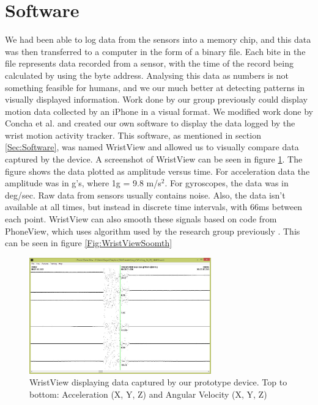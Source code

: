 \section{Software}
\label{Sec:ResultsSoftware}
We had been able to log data from the sensors into a memory chip,
and this data was then transferred to a computer in the form of a binary file.
Each bite in the file represents data recorded from a sensor,
with the time of the record being calculated by using the byte address.
Analysing this data as numbers is not something feasible for humans,
and we our much better at detecting patterns in visually displayed information.
Work done by our group previously could display motion data collected by an iPhone in a visual format.
We modified work done by Concha et al. \cite{concha2014study} and created our own software to display the data logged by the wrist motion activity tracker.
This software, as mentioned in section \ref{Sec:Software},
was named WristView and allowed us to visually compare data captured by the device.
A screenshot of WristView can be seen in figure \ref{Fig:WristView}.
The figure shows the data plotted as amplitude versus time.
For acceleration data the amplitude was in g's, where 1g = 9.8 m/s$^2$. For gyroscopes, the data was in deg/sec.
Raw data from sensors usually contains noise.
Also, the data isn't available at all times,
but instead in discrete time intervals, with 66ms between each point.
WristView can also smooth these signals based on code from PhoneView, which uses algorithm used by the research group previously \cite{concha2014study}. This can be seen in figure \ref{Fig:WristViewSoomth}
\begin{figure}
\begin{center}
\includegraphics[width=0.7\textwidth]{images/WristView.jpg}
\caption{WristView displaying data captured by our prototype device. Top to bottom: Acceleration (X, Y, Z) and Angular Velocity (X, Y, Z)}
\label{Fig:WristView}
\end{center}
\end{figure}

